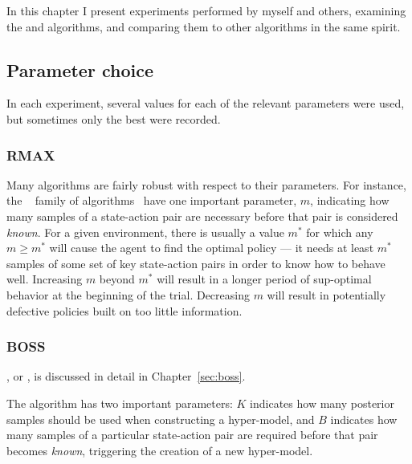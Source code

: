 In this chapter I present experiments performed by myself and others, examining the  and  algorithms, and comparing them to other algorithms in the same spirit.

\subsection{Parameter choice}

In each experiment, several values for each of the relevant parameters were used, but sometimes only the best were recorded.

\subsubsection{RMAX}

Many algorithms are fairly robust with respect to their parameters.
For instance, the ~\cite{brafman02} family of algorithms~\cite{jong07,asmuth08} have one important parameter, $m$, indicating how many samples of a state-action pair are necessary before that pair is considered \emph{known}. For a given environment, there is usually a value $m^*$ for which any $m\geq m^*$ will cause the  agent to find the optimal policy --- it needs at least $m^*$ samples of some set of key state-action pairs in order to know how to behave well. Increasing $m$ beyond $m^*$ will result in a longer period of sup-optimal behavior at the beginning of the trial. Decreasing $m$ will result in potentially defective policies built on too little information.

\subsubsection{BOSS}

, or , is discussed in detail in Chapter~\ref{sec:boss}.

The  algorithm has two important parameters: $K$ indicates how many posterior samples should be used when constructing a hyper-model, and $B$ indicates how many samples of a particular state-action pair are required before that pair becomes \emph{known}, triggering the creation of a new hyper-model.


